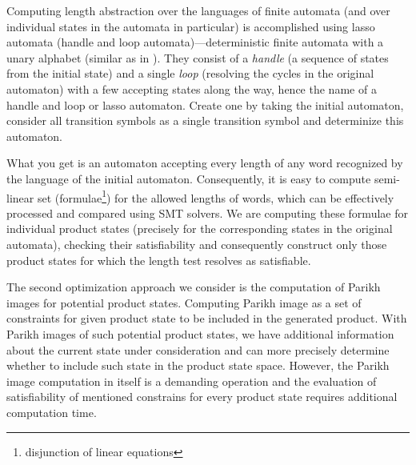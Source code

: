 
Computing length abstraction over the languages of finite automata (and over individual states in the automata in particular) is accomplished using lasso automata (handle and loop automata)---deterministic finite automata with a unary alphabet (similar as in \cite{DBLP:conf/cav/AbdullaACHRRS14}). They consist of a \emph{handle} (a sequence of states from the initial state) and a single \emph{loop} (resolving the cycles in the original automaton) with a few accepting states along the way, hence the name of a handle and loop or lasso automaton. Create one by taking the initial automaton, consider all transition symbols as a single transition symbol and determinize this automaton.

What you get is an automaton accepting every length of any word recognized by the language of the initial automaton. Consequently, it is easy to compute semi-linear set (formulae\footnote{disjunction of linear equations}) for the allowed lengths of words, which can be effectively processed and compared using SMT solvers. We are computing these formulae for individual product states (precisely for the corresponding states in the original automata), checking their satisfiability and consequently construct only those product states for which the length test resolves as satisfiable.


The second optimization approach we consider is the computation of Parikh images for potential product states. Computing Parikh image as a set of constraints for given product state to be included in the generated product. With Parikh images of such potential product states, we have additional information about the current state under consideration and can more precisely determine whether to include such state in the product state space. However, the Parikh image computation in itself is a demanding operation and the evaluation of satisfiability of mentioned constrains for every product state requires additional computation time.

